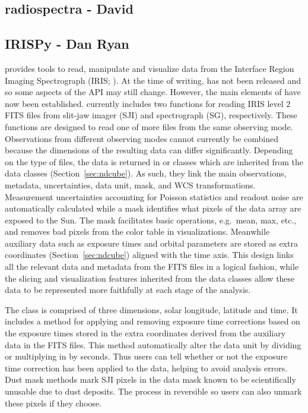 \subsection{radiospectra - David}


\subsection{IRISPy - Dan Ryan}
\label{sec:irispy}
 provides tools to read, manipulate and visualize data from the Interface Region Imaging Spectrograph (IRIS; \citealt{DePontieu2014}).
At the time of writing,  has not been released and so some aspects of the API may still change.
However, the main elements of  have now been established.
 currently includes two functions for reading IRIS level 2 FITS files from slit-jaw imager (SJI) and  spectrograph (SG), respectively.
These functions are designed to read one of more files from the same observing mode.
Observations from different observing modes cannot currently be combined because the dimensions of the resulting data can differ significantly.
Depending on the type of files, the data is returned in  or  classes which are inherited from the  data classes (Section~\ref{sec:ndcube}).
As such, they link the main observations, metadata, uncertainties, data unit, mask, and WCS transformations.
Measurement uncertainties accounting for Poisson statistics and readout noise are automatically calculated while a mask identifies what pixels of the data array are exposed to the Sun.
The mask facilitates basic operations, e.g.\ mean, max, etc., and removes bad pixels from the color table in visualizations.
Meanwhile auxiliary data such as exposure times and orbital parameters are stored as extra coordinates (Section~\ref{sec:ndcube}) aligned with the time axis.
This design links all the relevant data and metadata from the FITS files in a logical fashion, while the slicing and visualization features inherited from the  data classes allow these data to be represented more faithfully at each stage of the analysis.

The  class is comprised of three dimensions, solar longitude, latitude and time.
It includes a method for applying and removing exposure time corrections based on the exposure times stored in the extra coordinates derived from the auxiliary data in the FITS files.
This method automatically alter the data unit by dividing or multiplying in by seconds.
Thus users can tell whether or not the exposure time correction has been applied to the data, helping to avoid analysis errors.
Dust mask methods mark SJI pixels in the data mask known to be scientifically unusable due to dust deposits.
The process in reversible so users can also unmark these pixels if they choose.

